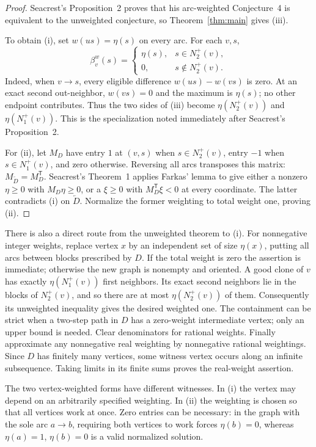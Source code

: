 \begin{proof}
Seacrest's Proposition~2 proves that his arc-weighted Conjecture~4 is
equivalent to the unweighted conjecture, so Theorem~\ref{thm:main} gives
\textup{(iii)}.

To obtain \textup{(i)}, set $w(us)=\eta(s)$ on every arc.  For each $v,s$,
\[
 \beta_v^w(s)=
 \begin{cases}
  \eta(s),&s\in N_2^+(v),\\
  0,&s\notin N_2^+(v).
 \end{cases}
\]
Indeed, when $v\to s$, every eligible difference $w(us)-w(vs)$ is zero.
At an exact second out-neighbor, $w(vs)=0$ and the maximum is $\eta(s)$;
no other endpoint contributes.  Thus the two sides of \textup{(iii)}
become $\eta(N_2^+(v))$ and $\eta(N_1^+(v))$.  This is the
specialization noted immediately after Seacrest's Proposition~2.

For \textup{(ii)}, let $M_D$ have entry $1$ at $(v,s)$ when
$s\in N_2^+(v)$, entry $-1$ when $s\in N_1^+(v)$, and zero otherwise.
Reversing all arcs transposes this matrix:
$M_{\overleftarrow D}=M_D^{\mathsf T}$.  Seacrest's Theorem~1 applies
Farkas' lemma to give either a nonzero $\eta\ge0$ with $M_D\eta\ge0$,
or a $\xi\ge0$ with $M_D^{\mathsf T}\xi<0$ at every coordinate.
The latter contradicts \textup{(i)} on $\overleftarrow D$.
Normalize the former weighting to total weight one, proving \textup{(ii)}.
\end{proof}

\begin{remark}
There is also a direct route from the unweighted theorem to \textup{(i)}.
For nonnegative integer weights, replace vertex $x$ by an independent set
of size $\eta(x)$, putting all arcs between blocks prescribed by $D$.
If the total weight is zero the assertion is immediate; otherwise the
new graph is nonempty and oriented. A good clone of $v$ has exactly
$\eta(N_1^+(v))$ first neighbors. Its exact second neighbors lie in the
blocks of $N_2^+(v)$, and so there are at most $\eta(N_2^+(v))$ of them.
Consequently its unweighted inequality gives the desired weighted one.
The containment can be strict when a two-step path in $D$ has a zero-weight
intermediate vertex; only an upper bound is needed. Clear denominators for
rational weights. Finally approximate any nonnegative real weighting by
nonnegative rational weightings. Since $D$ has finitely many vertices,
some witness vertex occurs along an infinite subsequence. Taking limits
in its finite sums proves the real-weight assertion.

The two vertex-weighted forms have different witnesses. In \textup{(i)}
the vertex may depend on an arbitrarily specified weighting. In
\textup{(ii)} the weighting is chosen so that all vertices work at once.
Zero entries can be necessary: in the graph with the sole arc $a\to b$,
requiring both vertices to work forces $\eta(b)=0$, whereas
$\eta(a)=1$, $\eta(b)=0$ is a valid normalized solution.
\end{remark}
